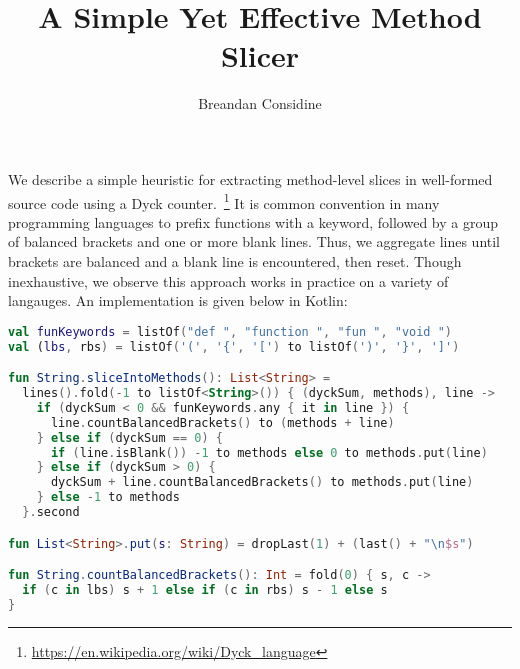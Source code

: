 \documentclass[12pt]{article}
\title{A Simple Yet Effective Method Slicer}
\author{Breandan Considine}
\begin{document}
  \maketitle
We describe a simple heuristic for extracting method-level slices in well-formed source code using a Dyck counter.~\footnote{\url{https://en.wikipedia.org/wiki/Dyck\_language}} It is common convention in many programming languages to prefix functions with a keyword, followed by a group of balanced brackets and one or more blank lines. Thus, we aggregate lines until brackets are balanced and a blank line is encountered, then reset. Though inexhaustive, we observe this approach works in practice on a variety of langauges. An implementation is given below in Kotlin:

  \vspace{5pt}

  \begin{lstlisting}[basicstyle=\footnotesize\ttfamily, language=kotlin,label={lst:lstlisting}]
val funKeywords = listOf("def ", "function ", "fun ", "void ")
val (lbs, rbs) = listOf('(', '{', '[') to listOf(')', '}', ']')

fun String.sliceIntoMethods(): List<String> =
  lines().fold(-1 to listOf<String>()) { (dyckSum, methods), line ->
    if (dyckSum < 0 && funKeywords.any { it in line }) {
      line.countBalancedBrackets() to (methods + line)
    } else if (dyckSum == 0) {
      if (line.isBlank()) -1 to methods else 0 to methods.put(line)
    } else if (dyckSum > 0) {
      dyckSum + line.countBalancedBrackets() to methods.put(line)
    } else -1 to methods
  }.second

fun List<String>.put(s: String) = dropLast(1) + (last() + "\n$s")

fun String.countBalancedBrackets(): Int = fold(0) { s, c ->
  if (c in lbs) s + 1 else if (c in rbs) s - 1 else s
}
  \end{lstlisting}
\end{document}
